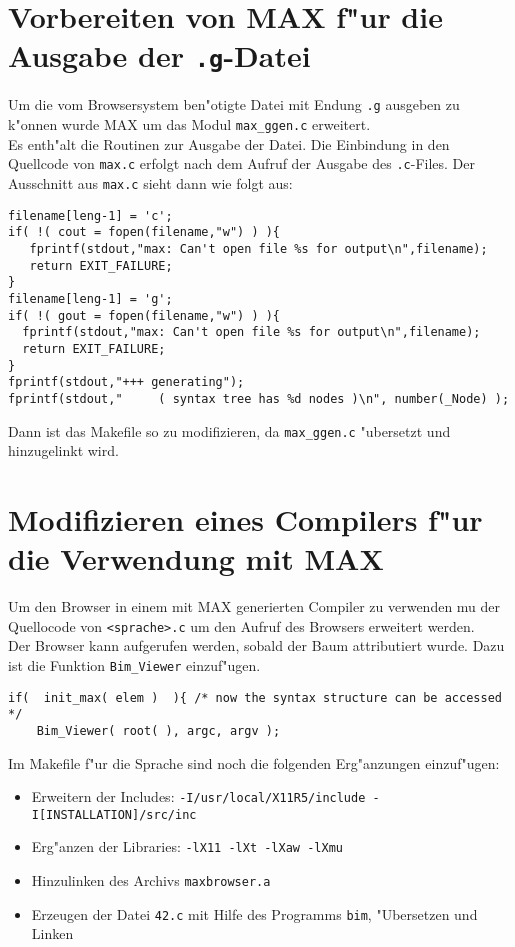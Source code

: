 \section{Vorbereiten von MAX f"ur die Ausgabe der {\tt.g}-Datei}
Um die vom Browsersystem ben"otigte Datei mit Endung {\tt .g} ausgeben
zu k"onnen wurde MAX um das Modul {\tt max\_ggen.c} erweitert.\\
Es enth"alt die Routinen zur Ausgabe der Datei. Die Einbindung in den
Quellcode von {\tt max.c} erfolgt nach dem Aufruf der
 Ausgabe des {\tt .c}-Files. Der Ausschnitt aus {\tt max.c} sieht 
dann wie folgt aus:

\begin{verbatim}
filename[leng-1] = 'c';
if( !( cout = fopen(filename,"w") ) ){
   fprintf(stdout,"max: Can't open file %s for output\n",filename);
   return EXIT_FAILURE;
}
filename[leng-1] = 'g';
if( !( gout = fopen(filename,"w") ) ){
  fprintf(stdout,"max: Can't open file %s for output\n",filename);
  return EXIT_FAILURE;
}
fprintf(stdout,"+++ generating");
fprintf(stdout,"     ( syntax tree has %d nodes )\n", number(_Node) );
\end{verbatim}
Dann ist das Makefile so zu modifizieren, da\3 {\tt max\_ggen.c} 
"ubersetzt und hinzugelinkt wird.
%
%
%
\section{Modifizieren eines Compilers f"ur die Verwendung mit MAX}
Um den Browser in einem mit MAX generierten Compiler zu verwenden
mu\3 der Quellocode von {\tt <sprache>.c} um den
Aufruf des Browsers erweitert werden.\\
Der Browser kann aufgerufen werden, sobald der Baum attributiert
wurde. Dazu ist die Funktion {\tt Bim\_Viewer} einzuf"ugen. 
\begin{verbatim}
if(  init_max( elem )  ){ /* now the syntax structure can be accessed  */
    Bim_Viewer( root( ), argc, argv );
\end{verbatim}
Im Makefile f"ur die Sprache sind noch die folgenden Erg"anzungen
einzuf"ugen:\\
\begin{itemize}
\item Erweitern der Includes: {\tt -I/usr/local/X11R5/include  -I[INSTALLATION]/src/inc}
\item Erg"anzen der Libraries: {\tt -lX11 -lXt -lXaw -lXmu}
\item Hinzulinken des Archivs {\tt maxbrowser.a}
\item Erzeugen der Datei {\tt 42.c} mit Hilfe des Programms {\tt bim}, "Ubersetzen und Linken
\end{itemize}

